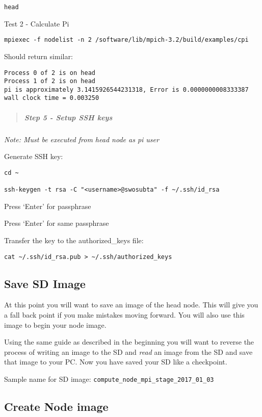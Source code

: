 \documentclass[]{article}
\let\oldsubparagraph\subparagraph
\renewcommand{\subparagraph}[1]{\oldsubparagraph{#1}\mbox{}}
\begin{document}
\texttt{head}

Test 2 - Calculate Pi

\texttt{mpiexec\ -f\ nodelist\ -n\ 2\ /software/lib/mpich-3.2/build/examples/cpi}

Should return similar:

\begin{verbatim}
Process 0 of 2 is on head
Process 1 of 2 is on head
pi is approximately 3.1415926544231318, Error is 0.0000000008333387
wall clock time = 0.003250
\end{verbatim}

\begin{quote}
\mbox{}%
\subparagraph{Step 5 - Setup SSH keys}\label{step-5---setup-ssh-keys}
\end{quote}

\emph{\emph{Note:} Must be executed from head node as pi user}

Generate SSH key:

\begin{verbatim}
cd ~

ssh-keygen -t rsa -C "<username>@swosubta" -f ~/.ssh/id_rsa
\end{verbatim}

Press `Enter' for passphrase

Press `Enter' for same passphrase

Transfer the key to the authorized\_keys file:

\begin{verbatim}
cat ~/.ssh/id_rsa.pub > ~/.ssh/authorized_keys
\end{verbatim}

\subsection{Save SD Image}\label{save-sd-image}

At this point you will want to save an image of the head node. This will
give you a fall back point if you make mistakes moving forward. You will
also use this image to begin your node image.

Using the same guide as described in the beginning you will want to
reverse the process of writing an image to the SD and \emph{read} an
image from the SD and save that image to your PC. Now you have saved
your SD like a checkpoint.

Sample name for SD image:
\texttt{compute\_node\_mpi\_stage\_2017\_01\_03}

\subsection{Create Node image}\label{create-node-image}
\end{document}
